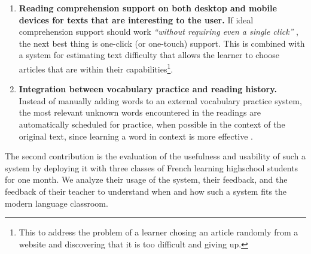 \begin{enumerate}
	
  \item {\bf Reading comprehension support on both desktop and mobile devices for texts that are interesting to the user.} If ideal comprehension support should work {\em ``without requiring even a single click''} \cite{Proszeky02-Comprehension}, the next best thing is one-click (or one-touch) support. This is combined with a system for estimating text difficulty that allows the learner to choose articles that are within their capabilities\footnote{This to address the problem of a learner chosing an article randomly from a website and discovering that it is too difficult and giving up. 
  }.

  \item {\bf Integration between vocabulary practice and reading history.} Instead of manually adding words to an external vocabulary practice system, the most relevant unknown words encountered in the readings are automatically scheduled for practice, when possible in the context of the original text, since learning a word in context is more effective \cite{nagy95-context}.

\end{enumerate}

The second contribution is the evaluation of the usefulness and usability of such a system by  deploying it with three classes of French learning highschool students for one month. We analyze their usage of the system, their feedback, and the feedback of their teacher to understand when and how such a system fits the modern language classroom.





